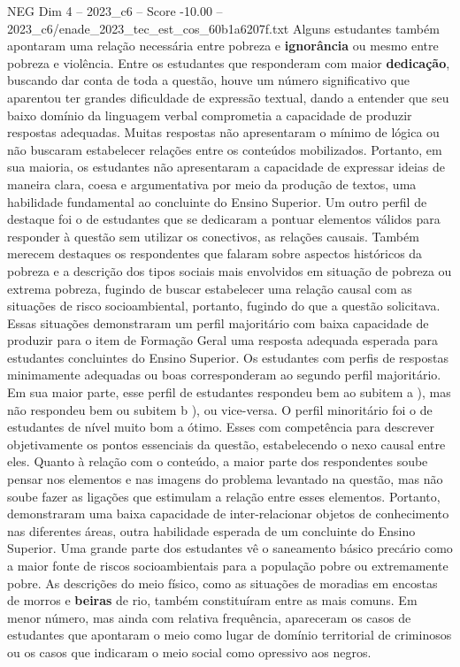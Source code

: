 \begin{textsample}{NEG Dim 4 – 2023\_c6 – Score -10.00 – 2023\_c6/enade\_2023\_tec\_est\_cos\_60b1a6207f.txt}
Alguns estudantes também apontaram uma relação necessária entre pobreza e \textbf{ignorância} ou mesmo entre pobreza e violência.
Entre os estudantes que responderam com maior \textbf{dedicação}, buscando dar conta de toda a questão, houve um número significativo que aparentou ter grandes dificuldade de expressão textual, dando a entender que seu baixo domínio da linguagem verbal comprometia a capacidade de produzir respostas adequadas.
Muitas respostas não apresentaram o mínimo de lógica ou não buscaram estabelecer relações entre os conteúdos mobilizados.
Portanto, em sua maioria, os estudantes não apresentaram a capacidade de expressar ideias de maneira clara, coesa e argumentativa por meio da produção de textos, uma habilidade fundamental ao concluinte do Ensino Superior.
Um outro perfil de destaque foi o de estudantes que se dedicaram a pontuar elementos válidos para responder à questão sem utilizar os conectivos, as relações causais.
Também merecem destaques os respondentes que falaram sobre aspectos históricos da pobreza e a descrição dos tipos sociais mais envolvidos em situação de pobreza ou extrema pobreza, fugindo de buscar estabelecer uma relação causal com as situações de risco socioambiental, portanto, fugindo do que a questão solicitava.
Essas situações demonstraram um perfil majoritário com baixa capacidade de produzir para o item de Formação Geral uma resposta adequada esperada para estudantes concluintes do Ensino Superior.
Os estudantes com perfis de respostas minimamente adequadas ou boas corresponderam ao segundo perfil majoritário.
Em sua maior parte, esse perfil de estudantes respondeu bem ao subitem a ), mas não respondeu bem ou subitem b ), ou vice-versa.
O perfil minoritário foi o de estudantes de nível muito bom a ótimo.
Esses com competência para descrever objetivamente os pontos essenciais da questão, estabelecendo o nexo causal entre eles.
Quanto à relação com o conteúdo, a maior parte dos respondentes soube pensar nos elementos e nas imagens do problema levantado na questão, mas não soube fazer as ligações que estimulam a relação entre esses elementos.
Portanto, demonstraram uma baixa capacidade de inter-relacionar objetos de conhecimento nas diferentes áreas, outra habilidade esperada de um concluinte do Ensino Superior.
Uma grande parte dos estudantes vê o saneamento básico precário como a maior fonte de riscos socioambientais para a população pobre ou extremamente pobre.
As descrições do meio físico, como as situações de moradias em encostas de morros e \textbf{beiras} de rio, também constituíram entre as mais comuns.
Em menor número, mas ainda com relativa frequência, apareceram os casos de estudantes que apontaram o meio como lugar de domínio territorial de criminosos ou os casos que indicaram o meio social como opressivo aos negros.

\end{textsample}
